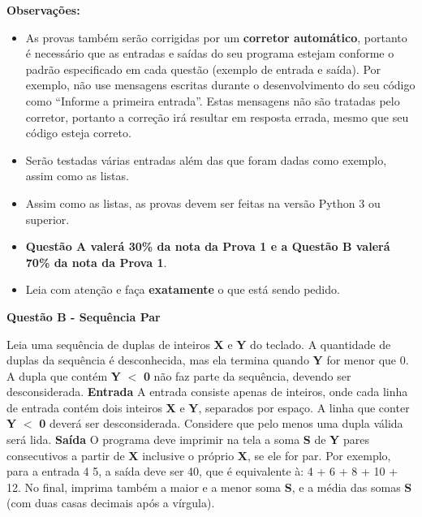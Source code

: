 \documentclass[a4paper, 12pt]{article}
\begin{document}
\textbf{{\large Observações:}}
\begin{itemize}
	\item As provas também serão corrigidas por um \textbf{corretor automático}, portanto é necessário que as entradas e saídas do seu programa estejam conforme o padrão especificado em cada questão (exemplo de entrada e saída). Por exemplo, não use mensagens escritas durante o desenvolvimento do seu código como “Informe a primeira entrada”. Estas mensagens não são tratadas pelo corretor, portanto a correção irá resultar em resposta errada, mesmo que seu código esteja correto.
	\item Serão testadas várias entradas além das que foram dadas como exemplo, assim como as listas.
	\item Assim como as listas, as provas devem ser feitas na versão Python 3 ou superior.
	\item \textbf{Questão A valerá 30\% da nota da Prova 1 e a Questão B valerá 70\% da nota da Prova 1}.
	\item Leia com atenção e faça \textbf{exatamente} o que está sendo pedido.
\end{itemize}
\newpage %
\begin{center}
\textbf{{\Large Questão B - Sequência Par}}
\end{center}
\vspace{5pt}
Leia uma sequência de duplas de inteiros \textbf{X} e \textbf{Y} do teclado. A quantidade de duplas da sequência é desconhecida, mas ela termina quando \textbf{Y} for menor que 0. A dupla que contém \textbf{Y} $<$ \textbf{0} não faz parte da sequência, devendo ser desconsiderada.
\newline \newline
\textbf{{\large Entrada}} \newline
A entrada consiste apenas de inteiros, onde cada linha de entrada contém dois inteiros \textbf{X} e \textbf{Y}, separados por espaço. A linha que conter \textbf{Y} $<$ \textbf{0} deverá ser desconsiderada. Considere que pelo menos uma dupla válida será lida.
\newline \newline
\textbf{{\large Saída}} \newline
O programa deve imprimir na tela a soma \textbf{S} de \textbf{Y} pares consecutivos a partir de \textbf{X} inclusive o próprio \textbf{X}, se ele for par. Por exemplo, para a entrada 4 5, a saída deve ser 40, que é equivalente à: 4 + 6 + 8 + 10 + 12. No final, imprima também a maior e a menor soma \textbf{S}, e a média das somas \textbf{S} (com duas casas decimais após a vírgula).
\end{document}
